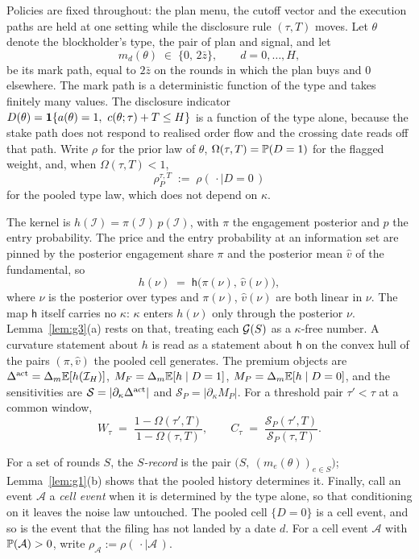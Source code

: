 Policies are fixed throughout: the plan menu, the cutoff vector and the execution paths are held
at one setting while the disclosure rule $(\tau,T)$ moves. Let $\theta$ denote the blockholder's
type, the pair of plan and signal, and let
\[
m_d(\theta) \;\in\; \{0,\,2\bar z\}, \qquad d = 0,\ldots,H,
\]
be its mark path, equal to $2\bar z$ on the rounds in which the plan buys and $0$ elsewhere. The
mark path is a deterministic function of the type and takes finitely many values. The disclosure
indicator $D(\theta) = \mathbf{1}\{a(\theta) = 1,\ c(\theta;\tau) + T \le H\}$ is a function of the type
alone, because the stake path does not respond to realised order flow and the crossing date reads
off that path. Write $\rho$ for the prior law of $\theta$, $\Omega(\tau,T) = \mathbb{P}(D=1)$ for the
flagged weight, and, when $\Omega(\tau,T) < 1$,
\[
\rho_P^{\tau,T} \;:=\; \rho(\,\cdot \mid D = 0\,)
\]
for the pooled type law, which does not depend on $\kappa$.

The kernel is $h(\mathcal I) = \pi(\mathcal I)\,p(\mathcal I)$, with $\pi$ the engagement
posterior and $p$ the entry probability. The price and the entry probability at an information
set are pinned by the posterior engagement share $\pi$ and the posterior mean $\hat v$ of the
fundamental, so
\begin{equation}
\label{eq:g-kernel}
h(\nu) \;=\; \mathsf h\bigl(\pi(\nu),\,\hat v(\nu)\bigr),
\end{equation}
where $\nu$ is the posterior over types and $\pi(\nu)$, $\hat v(\nu)$ are both linear in $\nu$.
The map $\mathsf h$ itself carries no $\kappa$: $\kappa$ enters $h(\nu)$ only through the
posterior $\nu$. Lemma~\ref{lem:g3}(a) rests on that, treating each $\mathcal{G}(S)$ as a
$\kappa$-free number. A curvature statement about $h$ is read as a statement about $\mathsf h$
on the convex hull of the pairs $(\pi,\hat v)$ the pooled cell generates. The premium objects are
$\Delta^{\mathrm{act}} = \Delta_m \mathbb{E}[h(\mathcal I_H)]$, $M_F = \Delta_m \mathbb{E}[h \mid D=1]$,
$M_P = \Delta_m \mathbb{E}[h \mid D=0]$, and the sensitivities are
$\mathcal S = |\partial_\kappa \Delta^{\mathrm{act}}|$ and $\mathcal S_P = |\partial_\kappa M_P|$. For a
threshold pair $\tau' < \tau$ at a common window,
\[
W_\tau \;=\; \frac{1-\Omega(\tau',T)}{1-\Omega(\tau,T)},
\qquad
C_\tau \;=\; \frac{\mathcal S_P(\tau',T)}{\mathcal S_P(\tau,T)} .
\]

For a set of rounds $S$, the \emph{$S$-record} is the pair
$\bigl(S,\ (m_e(\theta))_{e \in S}\bigr)$; Lemma~\ref{lem:g1}(b) shows that the pooled history
determines it. Finally, call an event $\mathcal A$ a \emph{cell event} when it is determined by
the type alone, so that conditioning on it leaves the noise law untouched. The pooled cell
$\{D = 0\}$ is a cell event, and so is the event that the filing has not landed by a date $d$.
For a cell event $\mathcal A$ with $\mathbb{P}(\mathcal A) > 0$, write $\rho_{\mathcal A} := \rho(\,\cdot \mid \mathcal A\,)$.

